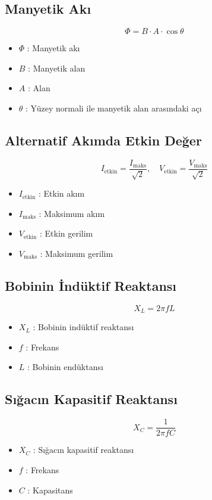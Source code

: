 \documentclass[a4paper, 11pt, titlepage]{article}
\begin{document}
\subsection{Manyetik Akı}
\[
\Phi = B \cdot A \cdot \cos \theta
\]
\begin{itemize}
  \item $\Phi$ : Manyetik akı
  \item $B$ : Manyetik alan
  \item $A$ : Alan
  \item $\theta$ : Yüzey normali ile manyetik alan arasındaki açı
\end{itemize}

\subsection{Alternatif Akımda Etkin Değer}
\[
I_{\mathrm{etkin}} = \frac{I_{\mathrm{maks}}}{\sqrt{2}}, \quad V_{\mathrm{etkin}} = \frac{V_{\mathrm{maks}}}{\sqrt{2}}
\]
\begin{itemize}
  \item $I_{\mathrm{etkin}}$ : Etkin akım
  \item $I_{\mathrm{maks}}$ : Maksimum akım
  \item $V_{\mathrm{etkin}}$ : Etkin gerilim
  \item $V_{\mathrm{maks}}$ : Maksimum gerilim
\end{itemize}

\subsection{Bobinin İndüktif Reaktansı}
\[
X_L = 2 \pi f L
\]
\begin{itemize}
  \item $X_L$ : Bobinin indüktif reaktansı
  \item $f$ : Frekans
  \item $L$ : Bobinin endüktansı
\end{itemize}

\subsection{Sığacın Kapasitif Reaktansı}
\[
X_C = \frac{1}{2 \pi f C}
\]
\begin{itemize}
  \item $X_C$ : Sığacın kapasitif reaktansı
  \item $f$ : Frekans
  \item $C$ : Kapasitans
\end{itemize}
\end{document}

